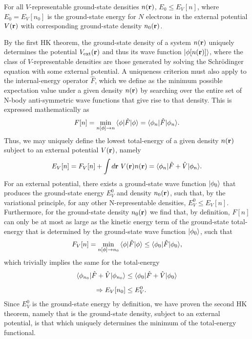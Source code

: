%
\begin{HK1}
For all $V$-representable 
ground-state densities $n({\bf r})$, 
$E_0 \leq E_V[n]$, 
where $E_0=E_V[n_0]$ 
is the ground-state energy for $N$ electrons 
in the external potential $V({\bf r})$ 
with corresponding ground-state density $n_0({\bf r})$.
\end{HK1}
%
\noindent
By the first HK theorem, 
the ground-state density of a system $n({\bf r})$ 
uniquely determines the potential $V_\textrm{ext}({\bf r})$
and thus its wave function $\vert\phi[n({\bf r})]\rangle$, 
where the class of $V$-representable densities 
are those generated by solving the 
Schr\"{o}dinger equation with some external potential.
%
A uniqueness criterion must also apply 
to the internal-energy operator $\hat{F}$, 
which we define as the minimum possible expectation value 
under a given density $n({\bf r})$
by searching over the entire set of N-body anti-symmetric 
wave functions that give rise to that density.
%
{This is expressed mathematically as}
%
\begin{equation}
F[n]=\min_{n[\phi]\to n} {\langle\phi\vert\hat{F}\vert\phi\rangle} = \langle\phi_n\vert\hat{F}\vert\phi_n\rangle.
\label{eq:f_formula}
\end{equation}
%
Thus,  we may uniquely define the lowest total-energy 
of a given density $n({\bf r})$ 
subject to an external potential $V({\bf r})$, 
namely 
%
\begin{equation}
E_V[n]=F_V[n]+\int d{\bf r}\ V({\bf r})n({\bf r}) = \langle\phi_n\vert\hat{F}+\hat{V}\vert\phi_n\rangle.
\end{equation}
%
For an external potential, 
there exists a ground-state wave function $\vert\phi_0\rangle$ 
that produces the ground-state energy $E^0_V$ 
and density $n_0({\bf r})$, 
such that, by the variational principle, 
for any other N-representable densities, 
$E^0_V\leq E_V[n]$. 
%
Furthermore, for the ground-state density $n_0({\bf r})$ 
we find that, by definition, $F[n]$ 
can only be at most as large 
as the kinetic energy term 
of the ground-state total-energy 
that is determined by the 
ground-state wave function $\vert\phi_0\rangle$, 
such that 
%
\begin{equation}
F_V[n]=\min_{n[\phi]\to n_0} {\langle\phi\vert\hat{F}\vert\phi\rangle} \leq \langle\phi_0\vert\hat{F}\vert\phi_0\rangle,
\end{equation}
%
which trivially implies the same for the total-energy 
%
\begin{align}
\langle\phi_{n_0}\vert\hat{F}+\hat{V}\vert\phi_{n_0}\rangle 
&\leq \langle\phi_0\vert\hat{F}+\hat{V}\vert\phi_0\rangle \nonumber \\[0.5em]
\Rightarrow E_V[n_0]&\leq E^0_V.
\end{align}
%
Since $E^0_V$ is the ground-state energy by definition, 
we have proven the second HK theorem, 
namely that is the ground-state density, 
subject to an external potential, 
is that which uniquely determines the 
minimum of the total-energy functional.

